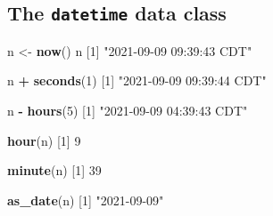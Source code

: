 \documentclass[
]{book}
\newenvironment{Shaded}{\begin{snugshade}}{\end{snugshade}}
\newcommand{\DecValTok}[1]{\textcolor[rgb]{0.00,0.00,0.81}{#1}}
\newcommand{\KeywordTok}[1]{\textcolor[rgb]{0.13,0.29,0.53}{\textbf{#1}}}
\newcommand{\NormalTok}[1]{#1}
\newcommand{\OperatorTok}[1]{\textcolor[rgb]{0.81,0.36,0.00}{\textbf{#1}}}
\newcommand{\StringTok}[1]{\textcolor[rgb]{0.31,0.60,0.02}{#1}}
\begin{document}
\hypertarget{the-datetime-data-class}{%
\subsection*{\texorpdfstring{The \texttt{datetime} data class}{The datetime data class}}\label{the-datetime-data-class}}

\begin{Shaded}
\begin{Highlighting}[]
\NormalTok{n <-}\StringTok{ }\KeywordTok{now}\NormalTok{() }
\NormalTok{n}
\NormalTok{[}\DecValTok{1}\NormalTok{] }\StringTok{"2021-09-09 09:39:43 CDT"}
\end{Highlighting}
\end{Shaded}

\begin{Shaded}
\begin{Highlighting}[]
\NormalTok{n }\OperatorTok{+}\StringTok{ }\KeywordTok{seconds}\NormalTok{(}\DecValTok{1}\NormalTok{)}
\NormalTok{[}\DecValTok{1}\NormalTok{] }\StringTok{"2021-09-09 09:39:44 CDT"}
\end{Highlighting}
\end{Shaded}

\begin{Shaded}
\begin{Highlighting}[]
\NormalTok{n }\OperatorTok{-}\StringTok{ }\KeywordTok{hours}\NormalTok{(}\DecValTok{5}\NormalTok{)}
\NormalTok{[}\DecValTok{1}\NormalTok{] }\StringTok{"2021-09-09 04:39:43 CDT"}
\end{Highlighting}
\end{Shaded}

\begin{Shaded}
\begin{Highlighting}[]
\KeywordTok{hour}\NormalTok{(n)}
\NormalTok{[}\DecValTok{1}\NormalTok{] }\DecValTok{9}
\end{Highlighting}
\end{Shaded}

\begin{Shaded}
\begin{Highlighting}[]
\KeywordTok{minute}\NormalTok{(n)}
\NormalTok{[}\DecValTok{1}\NormalTok{] }\DecValTok{39}
\end{Highlighting}
\end{Shaded}

\begin{Shaded}
\begin{Highlighting}[]
\KeywordTok{as_date}\NormalTok{(n)}
\NormalTok{[}\DecValTok{1}\NormalTok{] }\StringTok{"2021-09-09"}
\end{Highlighting}
\end{Shaded}
\end{document}
